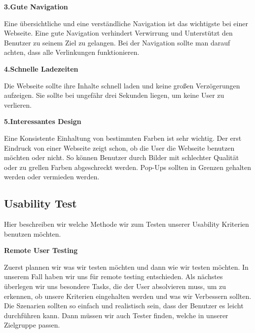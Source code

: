 \noindent\textbf{3.Gute Navigation}

\noindent Eine übersichtliche und eine verständliche Navigation ist das wichtigste bei einer Webseite.
Eine gute Navigation verhindert Verwirrung und Unterstützt den Benutzer zu seinem Ziel zu gelangen.
Bei der Navigation sollte man darauf achten, dass alle Verlinkungen funktionieren.
\newline

\noindent\textbf{4.Schnelle Ladezeiten}

\noindent Die Webseite sollte ihre Inhalte schnell laden und keine großen Verzögerungen
aufzeigen. Sie sollte bei ungefähr drei Sekunden liegen, um keine User zu verlieren.
\newline

\noindent\textbf{5.Interessantes Design}

\noindent Eine Konsistente Einhaltung von bestimmten Farben ist sehr wichtig. Der erst Eindruck von
einer Webseite zeigt schon, ob die User die Webseite benutzen möchten oder nicht.
So können Benutzer durch Bilder mit schlechter Qualität oder zu grellen Farben abgeschreckt werden.
Pop-Ups sollten in Grenzen gehalten werden oder vermieden werden.

\subsection{Usability Test}
Hier beschreiben wir welche Methode wir zum Testen unserer Usability Kriterien benutzen
möchten.
\newline

\noindent \textbf{Remote User Testing}

\noindent Zuerst plannen wir was wir testen möchten und dann wie wir testen möchten. In unserem Fall haben wir uns
für remote testing entschieden. Als nächstes überlegen wir uns besondere Tasks, die der User absolvieren muss, um
zu erkennen, ob unsere Kriterien eingehalten werden und was wir Verbessern sollten.
Die Szenarien sollten so einfach und realistisch sein, dass der Benutzer es leicht durchführen kann.
Dann müssen wir auch Tester finden, welche in unserer Zielgruppe passen.


